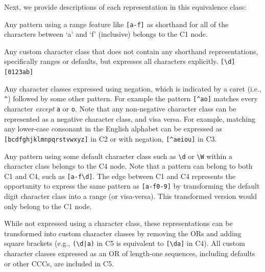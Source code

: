 Next, we provide descriptions of each representation in this equivalence class:
\begin{description}  \itemsep -1pt
\item[C1:] Any pattern using a range feature like \verb![a-f]! as shorthand for all of the characters between `a' and `f' (inclusive) belongs to the C1 node. 

\item[C2:] Any custom character class that does not contain any shorthand representations, specifically ranges or defaults, but expresses all characters explicitly. \verb![\d][0123ab]! 

\item[C3:] Any character classes expressed using negation, which is indicated by a caret (i.e., \verb!^!) followed by some other pattern.  For example the pattern \verb![^ao]! matches every character \emph{except} \verb!a! or \verb!o!.  Note that any non-negative character class can be represented as a negative character class, and visa versa.  For example, matching any lower-case consonant in the English alphabet can be expressed as \verb![bcdfghjklmnpqrstvwxyz]! in C2 or with negation, \verb![^aeiou]! in C3. 


\item[C4:] Any pattern using some default character class such as \verb!\d! or \verb!\W! within a character class belongs to the C4 node.  Note that a pattern can belong to both C1 and C4, such as \verb![a-f\d]!.  The edge between C1 and C4 represents the opportunity to express the same pattern as \verb![a-f0-9]! by transforming the default digit character class into a range (or visa-versa).  This transformed version would only belong to the C1 node.

\item[C5:] While not expressed using a character class, these representations can be transformed into custom character classes by removing the ORs and adding square brackets (e.g., \verb!(\d|a)! in C5 is equivalent to \verb![\da]! in C4). All custom character classes expressed as an OR of length-one sequences, including defaults or other CCCs, are included in C5. 
\end{description}


